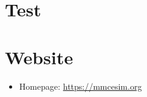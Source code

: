 \documentclass[]{mmcesim-cheatsheet}
\begin{document}
\maketitle
\section*{Test}
  \lipsum
  \lipsum
  \lipsum

\section*{Website}
\begin{itemize}
  \item Homepage: \url{https://mmcesim.org}
\end{itemize}
\end{document}
